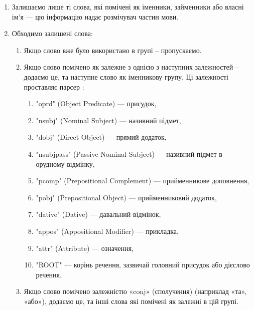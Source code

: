 \documentclass[14pt]{extarticle}
\begin{document}
  \begin{enumerate}[labelindent=\dimexpr\parindent*2\relax, leftmargin=*]
    \item Залишаємо лише ті слова, які помічені як іменники,
      займенники або власні ім'я --- цю інформацію надає розмічувач частин мови.
    \item Обходимо залишені слова:
    \begin{enumerate}
      \item Якщо слово вже було використано в групі -- пропускаємо.
      \item Якщо слово помічено як залежне з однією з наступних залежностей -- додаємо це, та наступне слово як іменникову групу.
        Ці залежності проставляє парсер \cite{spacy_label_scheme}:
        \begin{enumerate}
          \item "oprd" (Object Predicate) \cite{wiki_predicate_grammar} ---
            присудок,
          \item "nsubj" (Nominal Subject) \cite{nsubj_dep} --- називний підмет,
          \item "dobj" (Direct Object) \cite{wiki_dobj} --- прямий додаток,
          \item "nsubjpass" (Passive Nominal Subject) \cite{nsubj_pass_dep} ---
            називний підмет в орудному відмінку,
          \item "pcomp" (Prepositional Complement)
            \cite{wiki_prepositional_phrases} --- прийменникове доповнення,
          \item "pobj" (Prepositional Object) --- прийменниковий додаток,
          \item "dative" (Dative) \cite{wiki_dative} --- давальний відмінок,
          \item "appos" (Appositional Modifier) \cite{appos_dep} --- прикладка,
          \item "attr" (Attribute) \cite{wiki_grammatical_modifier} ---
            означення,
          \item "ROOT" \cite{root_dep} --- корінь речення,
            зазвичай головний присудок або дієслово речення.
        \end{enumerate}
     \item Якщо слово помічено залежністю «conj» (сполучення)
       \cite{wiki_conjunction, conj_dep}
       (наприклад «та», «або»),
       додаємо це, та інші слова які помічені як залежні в цій групі.
    \end{enumerate}
  \end{enumerate}
\end{document}

